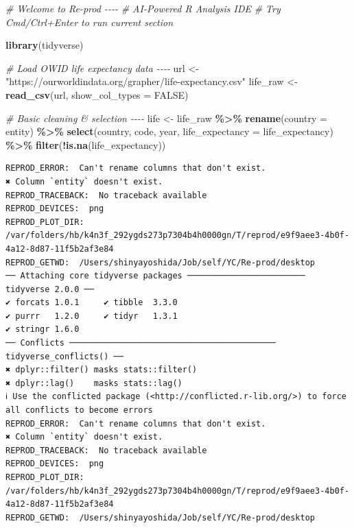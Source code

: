 \documentclass[
  11pt,
]{article}
\newenvironment{Shaded}{\begin{snugshade}}{\end{snugshade}}
\newcommand{\AttributeTok}[1]{\textcolor[rgb]{0.13,0.29,0.53}{#1}}
\newcommand{\CommentTok}[1]{\textcolor[rgb]{0.56,0.35,0.01}{\textit{#1}}}
\newcommand{\ConstantTok}[1]{\textcolor[rgb]{0.56,0.35,0.01}{#1}}
\newcommand{\FunctionTok}[1]{\textcolor[rgb]{0.13,0.29,0.53}{\textbf{#1}}}
\newcommand{\NormalTok}[1]{#1}
\newcommand{\OtherTok}[1]{\textcolor[rgb]{0.56,0.35,0.01}{#1}}
\newcommand{\SpecialCharTok}[1]{\textcolor[rgb]{0.81,0.36,0.00}{\textbf{#1}}}
\newcommand{\StringTok}[1]{\textcolor[rgb]{0.31,0.60,0.02}{#1}}
\newenvironment{rpoutput}{\vspace{0.5em}\begin{snugshade}}{\end{snugshade}}
\begin{document}
\begin{Shaded}
\begin{Highlighting}[]
\CommentTok{\# Welcome to Re{-}prod {-}{-}{-}{-}}
\CommentTok{\# AI{-}Powered R Analysis IDE}
\CommentTok{\# Try Cmd/Ctrl+Enter to run current section}

\FunctionTok{library}\NormalTok{(tidyverse)}

\CommentTok{\# Load OWID life expectancy data {-}{-}{-}{-}}
\NormalTok{url }\OtherTok{\textless{}{-}} \StringTok{"https://ourworldindata.org/grapher/life{-}expectancy.csv"}
\NormalTok{life\_raw }\OtherTok{\textless{}{-}} \FunctionTok{read\_csv}\NormalTok{(url, }\AttributeTok{show\_col\_types =} \ConstantTok{FALSE}\NormalTok{)}

\CommentTok{\# Basic cleaning \& selection {-}{-}{-}{-}}
\NormalTok{life }\OtherTok{\textless{}{-}}\NormalTok{ life\_raw }\SpecialCharTok{\%\textgreater{}\%}
  \FunctionTok{rename}\NormalTok{(}\AttributeTok{country =}\NormalTok{ entity) }\SpecialCharTok{\%\textgreater{}\%}
  \FunctionTok{select}\NormalTok{(country, code, year, }\AttributeTok{life\_expectancy =}\NormalTok{ life\_expectancy) }\SpecialCharTok{\%\textgreater{}\%}
  \FunctionTok{filter}\NormalTok{(}\SpecialCharTok{!}\FunctionTok{is.na}\NormalTok{(life\_expectancy))}
\end{Highlighting}
\end{Shaded}

\begin{rpoutput}

\begin{verbatim}
REPROD_ERROR:  Can't rename columns that don't exist.
✖ Column `entity` doesn't exist. 
REPROD_TRACEBACK:  No traceback available  
REPROD_DEVICES:  png 
REPROD_PLOT_DIR:  /var/folders/hb/k4n3f_292ygds273p7304b4h0000gn/T/reprod/e9f9aee3-4b0f-4a12-8d87-11f5b2af3e84 
REPROD_GETWD:  /Users/shinyayoshida/Job/self/YC/Re-prod/desktop 
── Attaching core tidyverse packages ──────────────────────── tidyverse 2.0.0 ──
✔ forcats 1.0.1     ✔ tibble  3.3.0
✔ purrr   1.2.0     ✔ tidyr   1.3.1
✔ stringr 1.6.0     
── Conflicts ────────────────────────────────────────── tidyverse_conflicts() ──
✖ dplyr::filter() masks stats::filter()
✖ dplyr::lag()    masks stats::lag()
ℹ Use the conflicted package (<http://conflicted.r-lib.org/>) to force all conflicts to become errors
REPROD_ERROR:  Can't rename columns that don't exist.
✖ Column `entity` doesn't exist. 
REPROD_TRACEBACK:  No traceback available  
REPROD_DEVICES:  png 
REPROD_PLOT_DIR:  /var/folders/hb/k4n3f_292ygds273p7304b4h0000gn/T/reprod/e9f9aee3-4b0f-4a12-8d87-11f5b2af3e84 
REPROD_GETWD:  /Users/shinyayoshida/Job/self/YC/Re-prod/desktop 
\end{verbatim}

\end{rpoutput}
\end{document}
